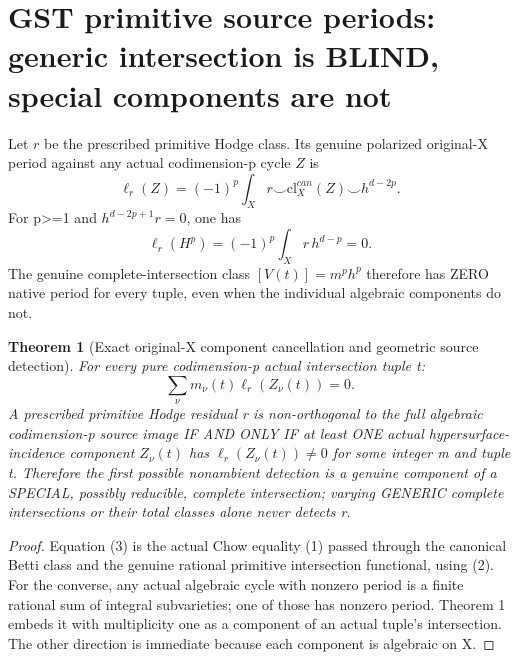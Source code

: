 \documentclass[11pt]{article}
\newcommand{\cl}{\mathrm{cl}}
\newtheorem{theorem}{Theorem}
\begin{document}
\section{GST primitive source periods: generic intersection is BLIND, special components are not}
Let \(r\) be the prescribed primitive Hodge class. Its genuine
polarized original-X period against any actual codimension-p
cycle \(Z\) is
\[
 \ell_r(Z)=(-1)^p\int_X
          r\smile \cl_X^{can}(Z)\smile h^{d-2p}.
\]
For p>=1 and \(h^{d-2p+1}r=0\), one has
\[
 \boxed{\ell_r(H^p)=(-1)^p\int_X r\,h^{d-p}=0.}       \tag{2}
\]
The genuine complete-intersection class
\([V(t)]=m^ph^p\) therefore has ZERO native period for
every tuple, even when the individual algebraic components do not.

\begin{theorem}[Exact original-X component cancellation and geometric source detection]
For every pure codimension-p actual intersection tuple t:
\[
 \boxed{\sum_{\nu}m_\nu(t)\ell_r(Z_\nu(t))=0.}       \tag{3}
\]
A prescribed primitive Hodge residual r is non-orthogonal to the
full algebraic codimension-p source image IF AND ONLY IF at least
ONE actual hypersurface-incidence component \(Z_\nu(t)\)
has \(\ell_r(Z_\nu(t))\ne0\) for some integer m and tuple t.
Therefore the first possible nonambient detection is a
genuine component of a SPECIAL, possibly reducible,
complete intersection; varying GENERIC complete
intersections or their total classes alone never detects r.
\end{theorem}
\begin{proof}
Equation (3) is the actual Chow equality (1) passed
through the canonical Betti class and the
genuine rational primitive intersection functional,
using (2). For the converse, any actual algebraic
cycle with nonzero period is a finite rational sum
of integral subvarieties; one of those has nonzero period.
Theorem 1 embeds it with multiplicity one as a component
of an actual tuple's intersection. The other direction
is immediate because each component is algebraic on X.
\end{proof}
\end{document}
